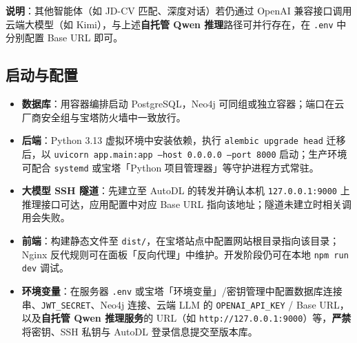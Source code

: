 \documentclass[12pt,a4paper]{ctexart}
\begin{document}
\textbf{说明}：其他智能体（如 JD-CV 匹配、深度对话）若仍通过 OpenAI 兼容接口调用云端大模型（如 Kimi），与上述\textbf{自托管 Qwen 推理}路径可并行存在，在 \texttt{.env} 中分别配置 Base URL 即可。

\subsection{启动与配置}

\begin{itemize}[itemsep=4pt]
  \item \textbf{数据库}：用容器编排启动 PostgreSQL，Neo4j 可同组或独立容器；端口在云厂商安全组与宝塔防火墙中一致放行。
  \item \textbf{后端}：Python 3.13 虚拟环境中安装依赖，执行 \texttt{alembic upgrade head} 迁移后，以 \texttt{uvicorn app.main:app --host 0.0.0.0 --port 8000} 启动；生产环境可配合 \texttt{systemd} 或宝塔「Python 项目管理器」等守护进程方式常驻。
  \item \textbf{大模型 SSH 隧道}：先建立至 AutoDL 的转发并确认本机 \texttt{127.0.0.1:9000} 上推理接口可达，应用配置中对应 Base URL 指向该地址；隧道未建立时相关调用会失败。
  \item \textbf{前端}：构建静态文件至 \texttt{dist/}，在宝塔站点中配置网站根目录指向该目录；Nginx 反代规则可在面板「反向代理」中维护。开发阶段仍可在本地 \texttt{npm run dev} 调试。
  \item \textbf{环境变量}：在服务器 \texttt{.env} 或宝塔「环境变量」/密钥管理中配置数据库连接串、\texttt{JWT\_SECRET}、Neo4j 连接、云端 LLM 的 \texttt{OPENAI\_API\_KEY} / Base URL，以及\textbf{自托管 Qwen 推理服务}的 URL（如 \texttt{http://127.0.0.1:9000}）等，\textbf{严禁}将密钥、SSH 私钥与 AutoDL 登录信息提交至版本库。
\end{itemize}
\end{document}
